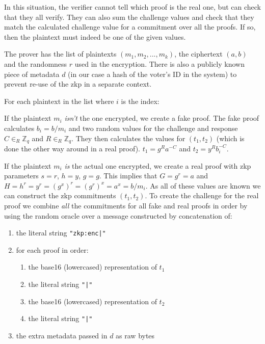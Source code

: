 In this situation, the verifier cannot tell which proof is the real one, but can check that they all verify. They can also sum the challenge values and check that they match the calculated challenge value for a commitment over all the proofs. If so, then the plaintext must indeed be one of the given values.

The prover has the list of plaintexts $(m_1, m_2, ..., m_k)$, the ciphertext $(a,b)$ and the randomness $r$ used in the encryption. There is also a publicly known piece of metadata $d$ (in our case a hash of the voter's ID in the system) to prevent re-use of the \gls{zkp} in a separate context.

For each plaintext in the list where $i$ is the index:

If the plaintext $m_i$ \emph{isn't} the one encrypted, we create a fake proof. The fake proof calculates $b_i = b / m_i$ and two random values for the challenge and response $C \in_{R} \mathbb{Z}_q$ and $R \in_{R} \mathbb{Z}_q$. They then calculates the values for $(t_1, t_2)$ (which is done the other way around in a real proof). $t_1 = g^Ra^{-C}$ and $t_2 = y^Rb_{i}^{-C}$.

If the plaintext $m_i$ \emph{is} the actual one encrypted, we create a real proof with \gls{zkp} parameters $s = r$, $h = y$, $g = g$. This implies that $G = g^r = a$ and $H = h^r = y^r = (g^x)^r = (g^r)^x = a^x = b/m_i$. As all of these values are known we can construct the \gls{zkp} commitments $(t_1, t_2)$. To create the challenge for the real proof we combine \emph{all} the commitments for all fake and real proofs in order by using the random oracle over a message constructed by concatenation of:

\begin{enumerate}
    \item the literal string \lstinline[style=ES6]{"zkp:enc|"}
    \item for each proof in order:
          \begin{enumerate}
              \item the base16 (lowercased) representation of $t_1$
              \item the literal string \lstinline[style=ES6]{"|"}
              \item the base16 (lowercased) representation of $t_2$
              \item the literal string \lstinline[style=ES6]{"|"}
          \end{enumerate}
    \item the extra metadata passed in $d$ as raw bytes
\end{enumerate}

